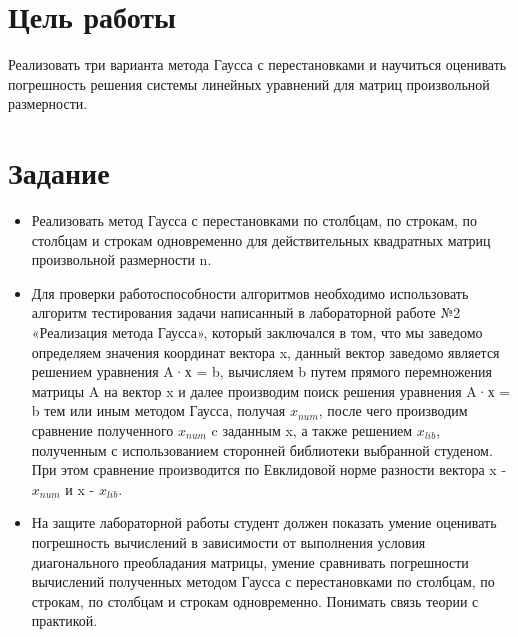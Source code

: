 \documentclass[a4paper, 14pt]{extarticle}
\begin{document}
\renewcommand{\ttdefault}{pcr}

\setlength{\tabcolsep}{3pt}
\newpage
\setcounter{page}{2}

\section{Цель работы}\label{Sect::goal}

Реализовать три варианта метода Гаусса с перестановками и научиться
оценивать погрешность решения системы линейных уравнений для матриц
произвольной размерности.

\section{Задание}\label{Sect::task}

\begin{itemize}
    \item Реализовать метод Гаусса с перестановками по столбцам, по строкам, по столбцам и строкам одновременно для действительных квадратных матриц произвольной размерности n.
    \item Для проверки работоспособности алгоритмов необходимо использовать алгоритм тестирования задачи написанный в лабораторной работе №2 «Реализация метода Гаусса», который заключался в том, что мы заведомо определяем значения координат вектора x, данный вектор заведомо является решением уравнения A·х = b, вычисляем b путем прямого перемножения матрицы A на вектор x и далее производим поиск решения уравнения A·х = b тем или иным методом Гаусса, получая $x_{num}$, после чего производим сравнение полученного $x_{num}$ c заданным x, а также решением $x_{lib}$, полученным с использованием сторонней библиотеки выбранной студеном. При этом сравнение производится по Евклидовой норме разности вектора x - $x_{num}$ и x - $x_{lib}$.
    \item На защите лабораторной работы студент должен показать умение оценивать погрешность вычислений в зависимости от выполнения условия диагонального преобладания матрицы, умение сравнивать погрешности вычислений полученных методом Гаусса с перестановками по столбцам, по строкам, по столбцам и строкам одновременно. Понимать связь теории с практикой.

\end{itemize}
\end{document}

